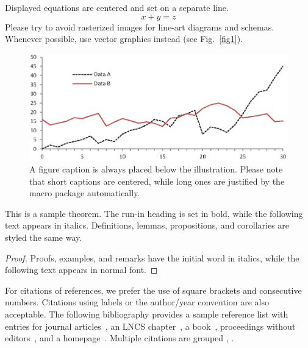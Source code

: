 \documentclass[runningheads]{llncs}
\begin{document}
\noindent Displayed equations are centered and set on a separate
line.
\begin{equation}
x + y = z
\end{equation}
Please try to avoid rasterized images for line-art diagrams and
schemas. Whenever possible, use vector graphics instead (see
Fig.~\ref{fig1}).

\begin{figure}
\includegraphics[width=\textwidth]{fig1.eps}
\caption{A figure caption is always placed below the illustration.
Please note that short captions are centered, while long ones are
justified by the macro package automatically.} \label{fig2}
\end{figure}

\begin{theorem}
This is a sample theorem. The run-in heading is set in bold, while
the following text appears in italics. Definitions, lemmas,
propositions, and corollaries are styled the same way.
\end{theorem}
%
%
\begin{proof}
Proofs, examples, and remarks have the initial word in italics,
while the following text appears in normal font.
\end{proof}
For citations of references, we prefer the use of square brackets
and consecutive numbers. Citations using labels or the author/year
convention are also acceptable. The following bibliography provides
a sample reference list with entries for journal
articles~\cite{ref_article1}, an LNCS chapter~\cite{ref_lncs1}, a
book~\cite{ref_book1}, proceedings without editors~\cite{ref_proc1},
and a homepage~\cite{ref_url1}. Multiple citations are grouped
\cite{ref_article1,ref_lncs1,ref_book1},
\cite{ref_article1,ref_book1,ref_proc1,ref_url1}.

%
%
%


\end{document}
